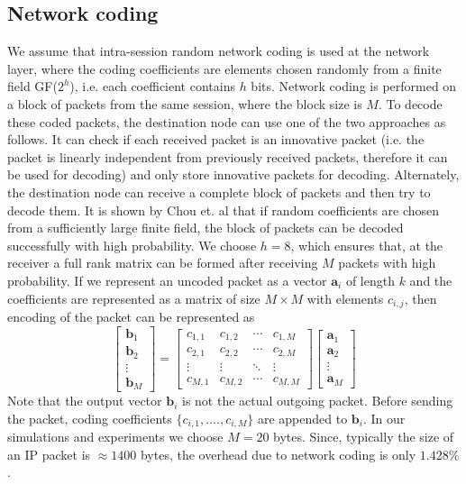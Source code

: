 \documentclass{sig-alternate-10pt}
\begin{document}
\newpage
\subsection{Network coding }
We assume that intra-session random network coding is used at the network layer, where the coding coefficients are elements chosen randomly from a finite field GF($2^h$), i.e. each coefficient contains $h$ bits.  Network coding is performed on a block of packets from the same session, where the block size is $M$. To decode these coded packets, the destination node can use one of the two approaches as follows. It can  check if each received packet is an innovative packet (i.e. the packet is linearly independent from previously received packets, therefore it can be used for decoding)  and only store innovative packets for decoding. Alternately, the destination node can receive a complete block of packets and then try to decode them. It is shown by Chou et. al \cite{Chou03practicalnetwork} that if random coefficients are chosen from a sufficiently large finite field, the block of packets can be decoded successfully with high probability. We choose $h=8$, which ensures that, at the receiver a full rank matrix can be formed after receiving $M$ packets with high probability.  If we represent an uncoded packet as a vector $\textbf{a}_i$ of length $k$ and the coefficients are represented as a matrix of size $M\times M$ with elements $c_{i,j}$, then encoding of the packet can be represented as 
 \begin{equation*}
 \begin{bmatrix}
   \textbf{b}_1 \\
   \textbf{b}_2 \\
   \vdots  \\
   \textbf{b}_M
 \end{bmatrix} =
 \begin{bmatrix}
  c_{1,1} & c_{1,2} & \cdots & c_{1,M} \\
  c_{2,1} & c_{2,2} & \cdots & c_{2,M} \\
  \vdots  & \vdots  & \ddots & \vdots  \\
  c_{M,1} & c_{M,2} & \cdots & c_{M,M}
 \end{bmatrix}
 \begin{bmatrix}
   \textbf{a}_1 \\
   \textbf{a}_2 \\
   \vdots  \\
   \textbf{a}_M
 \end{bmatrix}
 \end{equation*}
Note that the output vector $\textbf{b}_i$ is not the actual outgoing packet. Before sending the packet, coding coefficients $\{c_{i,1}, .... , c_{i,M}\}$ are appended to $\textbf{b}_i$. In our simulations and experiments we choose $M = 20$ bytes. Since, typically the size of an IP packet is $\approx 1400$ bytes, the overhead due to network coding is only  $1.428 \%$.
\end{document}
